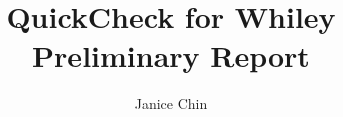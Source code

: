 \documentclass[11pt
              , a4paper
              , oneside
              , openright
              ]{report}
\title{QuickCheck for Whiley Preliminary Report}
\author{Janice Chin}
\date{}
\begin{document}
\frontmatter



\begin{abstract}

\end{abstract}


\maketitle

\tableofcontents



\mainmatter










\backmatter




%


\appendix


\end{document}
